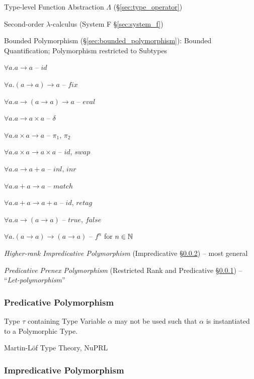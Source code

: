 Type-level Function Abstraction $\Lambda$ (\S\ref{sec:type_operator})

Second-order $\lambda$-calculus (System F \S\ref{sec:system_f})

Bounded Polymorphism (\S\ref{sec:bounded_polymorphism}): Bounded Quantification;
Polymorphism restricted to Subtypes


\asterism


$\forall a.a \rightarrow a$ -- $id$

$\forall a.(a \rightarrow a) \rightarrow a$ -- $fix$

$\forall a.a \rightarrow (a \rightarrow a) \rightarrow a$ -- $eval$


$\forall a.a \rightarrow a \times a$ -- $\delta$

$\forall a.a \times a \rightarrow a$ -- $\pi_1$, $\pi_2$

$\forall a.a \times a \rightarrow a \times a$ -- $id$, $swap$


$\forall a.a \rightarrow a + a$ -- $inl$, $inr$

$\forall a.a + a \rightarrow a$ -- $match$

$\forall a.a + a \rightarrow a + a$ -- $id$, $retag$


$\forall a.a \rightarrow (a \rightarrow a)$ -- $true$, $false$


$\forall a.(a \rightarrow a) \rightarrow (a \rightarrow a)$ -- $f^n$
for $n \in \mathbb{N}$


\asterism


\emph{Higher-rank Impredicative Polymorphism} (Impredicative
\S\ref{sec:impredicative_polymorphism}) -- most general

\emph{Predicative Prenex Polymorphism} (Restricted Rank and
Predicative \S\ref{sec:predicative_polymorphism}) --
``\emph{Let-polymorphism}''



\subsubsection{Predicative Polymorphism}\label{sec:predicative_polymorphism}

Type $\tau$ containing Type Variable $\alpha$ may not be used such that $\alpha$
is instantiated to a Polymorphic Type.

Martin-L\"of Type Theory, NuPRL



\subsubsection{Impredicative Polymorphism}\label{sec:impredicative_polymorphism}

